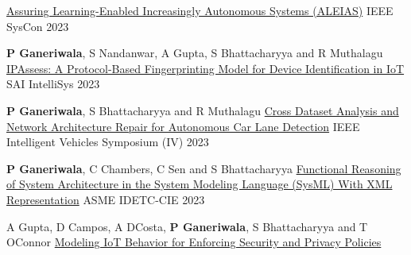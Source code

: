 \begin{cventries}
{\href{https://ieeexplore.ieee.org/abstract/document/10131227}{Assuring Learning-Enabled Increasingly Autonomous Systems (ALEIAS)}}
{}
{IEEE SysCon 2023} 
{ %
\begin{cvitems}
\end{cvitems}
}
\cventry
{\textbf{P Ganeriwala}, S Nandanwar, A Gupta, S Bhattacharyya and R Muthalagu}
{\href{https://link.springer.com/chapter/10.1007/978-3-031-47715-7_46}{IPAssess: A Protocol-Based Fingerprinting Model for Device Identification in IoT}}
{}
{SAI IntelliSys 2023} 
{ %
\begin{cvitems}
\end{cvitems}
}
\cventry
{\textbf{P Ganeriwala}, S Bhattacharyya and R Muthalagu}
{\href{https://ieeexplore.ieee.org/abstract/document/10186721}{Cross Dataset Analysis and Network Architecture Repair for Autonomous Car Lane Detection}}
{}
{IEEE Intelligent Vehicles Symposium (IV) 2023}
{ %
\begin{cvitems}
\end{cvitems}
}
\cventry
{\textbf{P Ganeriwala}, C Chambers, C Sen and S Bhattacharyya}
{\href{https://asmedigitalcollection.asme.org/IDETC-CIE/proceedings-abstract/IDETC-CIE2023/87295/1170388}{Functional Reasoning of System Architecture in the System Modeling Language (SysML) With XML Representation}}
{}
{ASME IDETC-CIE 2023} 
{ %
\begin{cvitems}
\end{cvitems}
}
\cventry
{A Gupta, D Campos, A DCosta, \textbf{P Ganeriwala}, S Bhattacharyya and T OConnor}
{\href{https://link.springer.com/chapter/10.1007/978-3-031-37717-4_95}{Modeling IoT Behavior for Enforcing Security and Privacy Policies}}

\end{cventries}
